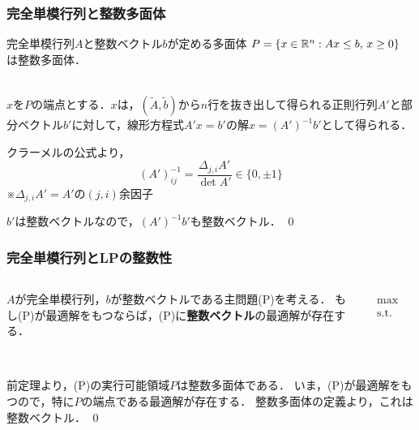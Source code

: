 \documentclass[14pt,aspectratio=169,xcolor=dvipsnames,table,onlytextwidth,dvipdfmx]{beamer}
\begin{document}
\begin{frame}
    \frametitle{完全単模行列と整数多面体}

    \small

    \begin{theorem}
        完全単模行列$A$と整数ベクトル$b$が定める多面体
        $
        P = \{ x \in \mathbb{R}^n : Ax \leq b, \, x \geq 0 \} 
        $
    は整数多面体．
    \end{theorem}
    
    \pause
     \\
    $x$を$P$の端点とする．$x$は，$(\tilde A, \tilde b)$から$n$行を抜き出して得られる正則行列$A'$と部分ベクトル$b'$に対して，線形方程式$A' x = b'$の解$x = (A')^{-1}b'$として得られる．

    \pause
    クラーメルの公式より，
    \[
        (A')^{-1}_{ij} = \frac{\Delta_{j,i} A'}{\det A'} \in \{0,\pm 1\}
    \]
    {\footnotesize ※$\Delta_{j,i} A' = A'$の$(j,i)$余因子}

    $b'$は整数ベクトルなので，$(A')^{-1}b'$も整数ベクトル． \qed

\end{frame}

\begin{frame}
    \frametitle{完全単模行列とLPの整数性}
    
    \begin{columns}[T]
    \begin{column}{.75\textwidth}
    \begin{theorem}[]
        $A$が完全単模行列，$b$が整数ベクトルである主問題(P)を考える．
        もし(P)が最適解をもつならば，(P)に\textbf{整数ベクトル}の最適解が存在する．
    \end{theorem}
    \end{column}
    \begin{column}{.2\textwidth}
        \footnotesize
    \begin{primal}
        \setlength{\abovedisplayskip}{0pt}
        \begin{alignat*}{2}
            \text{max} & \quad  c^\top x \\
            \text{s.t.} & \quad A x \leq b  \\
            & \quad x \geq 0 
        \end{alignat*}
    \end{primal}
    \end{column}
    \end{columns}

    \pause \vfill
     \\
    前定理より，(P)の実行可能領域$P$は整数多面体である．
    いま，(P)が最適解をもつので，特に$P$の端点である最適解が存在する．
    整数多面体の定義より，これは整数ベクトル． \qed
\end{frame}
\end{document}
